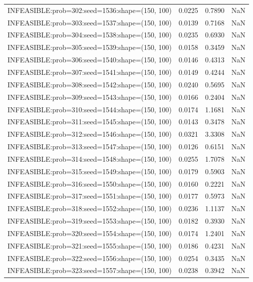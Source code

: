 \begin{longtable}{lccc}
INFEASIBLE:prob=302:seed=1536:shape=(150, 100) &   0.0225 &  0.7890 &    NaN \\
INFEASIBLE:prob=303:seed=1537:shape=(150, 100) &   0.0139 &  0.7168 &    NaN \\
INFEASIBLE:prob=304:seed=1538:shape=(150, 100) &   0.0235 &  0.6930 &    NaN \\
INFEASIBLE:prob=305:seed=1539:shape=(150, 100) &   0.0158 &  0.3459 &    NaN \\
INFEASIBLE:prob=306:seed=1540:shape=(150, 100) &   0.0146 &  0.4313 &    NaN \\
INFEASIBLE:prob=307:seed=1541:shape=(150, 100) &   0.0149 &  0.4244 &    NaN \\
INFEASIBLE:prob=308:seed=1542:shape=(150, 100) &   0.0240 &  0.5695 &    NaN \\
INFEASIBLE:prob=309:seed=1543:shape=(150, 100) &   0.0166 &  0.2404 &    NaN \\
INFEASIBLE:prob=310:seed=1544:shape=(150, 100) &   0.0174 &  1.1681 &    NaN \\
INFEASIBLE:prob=311:seed=1545:shape=(150, 100) &   0.0143 &  0.3478 &    NaN \\
INFEASIBLE:prob=312:seed=1546:shape=(150, 100) &   0.0321 &  3.3308 &    NaN \\
INFEASIBLE:prob=313:seed=1547:shape=(150, 100) &   0.0126 &  0.6151 &    NaN \\
INFEASIBLE:prob=314:seed=1548:shape=(150, 100) &   0.0255 &  1.7078 &    NaN \\
INFEASIBLE:prob=315:seed=1549:shape=(150, 100) &   0.0179 &  0.5903 &    NaN \\
INFEASIBLE:prob=316:seed=1550:shape=(150, 100) &   0.0160 &  0.2221 &    NaN \\
INFEASIBLE:prob=317:seed=1551:shape=(150, 100) &   0.0177 &  0.5973 &    NaN \\
INFEASIBLE:prob=318:seed=1552:shape=(150, 100) &   0.0236 &  1.1137 &    NaN \\
INFEASIBLE:prob=319:seed=1553:shape=(150, 100) &   0.0182 &  0.3930 &    NaN \\
INFEASIBLE:prob=320:seed=1554:shape=(150, 100) &   0.0174 &  1.2401 &    NaN \\
INFEASIBLE:prob=321:seed=1555:shape=(150, 100) &   0.0186 &  0.4231 &    NaN \\
INFEASIBLE:prob=322:seed=1556:shape=(150, 100) &   0.0254 &  0.3435 &    NaN \\
INFEASIBLE:prob=323:seed=1557:shape=(150, 100) &   0.0238 &  0.3942 &    NaN \\

\end{longtable}
